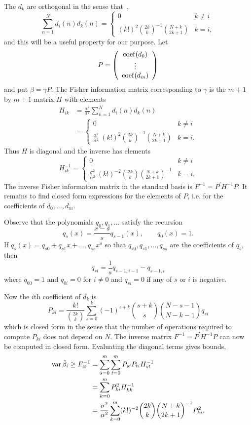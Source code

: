 \documentclass[journal,10pt]{IEEEtran}
\begin{document}
The $d_k$ are orthogonal in the sense that~\cite{Eisinberg2007_discerete_otho_poly_equidist},
\[
\sum_{n=1}^{N}{ d_i(n) d_k(n) } = \begin{cases}
0 &  k\neq i \\
(k!)^2 \binom{2k}{k}^{-1} \binom{N+k}{2k+1}  & k = i,
\end{cases}
\]
and this will be a useful property for our purpose.  Let 
\[
P = \left( \begin{array}{c}
\operatorname{coef}(d_0) \\
\vdots \\
\operatorname{coef}(d_m)
\end{array} \right)
\]
and put $\beta = \gamma P$.  The Fisher information matrix corresponding to $\gamma$ is the $m+1$ by $m+1$ matrix $H$ with elements
\begin{align*}
H_{ik} &= \frac{\alpha^2}{\sigma^2}\sum_{n=1}^{N} d_{i}(n) d_{k}(n) \\
&= \begin{cases}
0 &  k\neq i \\
 \frac{\alpha^2}{\sigma^2}\ (k!)^2 \binom{2k}{k}^{-1} \binom{N+k}{2k+1}  & k = i.
\end{cases}
\end{align*}
Thus $H$ is diagonal and the inverse has elements
\[
H_{ik}^{-1} = \begin{cases}
0 &  k\neq i \\
 \frac{\sigma^2}{\alpha^2}\ (k!)^{-2} \binom{2k}{k} \binom{N+k}{2k+1}^{-1}  & k = i.
\end{cases}
\] 
The inverse Fisher information matrix in the standard basis is $F^{-1} = P^\prime H^{-1} P$.  It remains to find closed form expressions for the elements of $P$, i.e. for the coefficients of $d_0,\dots,d_m$.  

Observe that the polynomials $q_0,q_1,\dots$ satisfy the recursion
\[
q_s(x) = \frac{x-s}{s} q_{s-1}(x), \qquad q_{0}(x) = 1.
\]
If $q_s(x) = q_{s0} + q_{s1}x + \dots, q_{ss}x^s$ so that $q_{s0},q_{s1},\dots,q_{ss}$ are the coefficients of $q_{s}$, then
\[
q_{si} = \frac{1}{s}q_{s-1,i-1} - q_{s-1,i}
\]
where $q_{00}=1$ and $q_{0i}=0$ for $i \neq 0$ and $q_{si} = 0$ if any of $s$ or $i$ is negative.

Now the $i$th coefficient of $d_k$ is
\[
P_{ki} = \frac{k!}{\binom{2k}{k}}\sum_{s=0}^k{(-1)^{s+k}\binom{s+k}{s}\binom{N-s-1}{N-k-1}q_{si}}
\]  
which is closed form in the sense that the number of operations required to compute $P_{ki}$ does not depend on $N$.  The inverse matrix $F^{-1} = P^\prime H^{-1} P$ can now be computed in closed form.  Evaluating the diagonal terms gives bounds,
\begin{align*}
\operatorname{var} \hat{\beta}_i \geq F_{ii}^{-1} &=  \sum_{s=0}^{m}\sum_{t=0}^{m} P_{si} P_{ti}  H_{st}^{-1} \\
&=  \sum_{k=0}^{m} P_{ki}^2  H_{kk}^{-1} \\
&= \frac{\sigma^2}{\alpha^2} \sum_{k=0}^{m} (k!)^{-2} \binom{2k}{k} \binom{N+k}{2k+1}^{-1} P_{ki}^2.
\end{align*}
 
\end{document}

